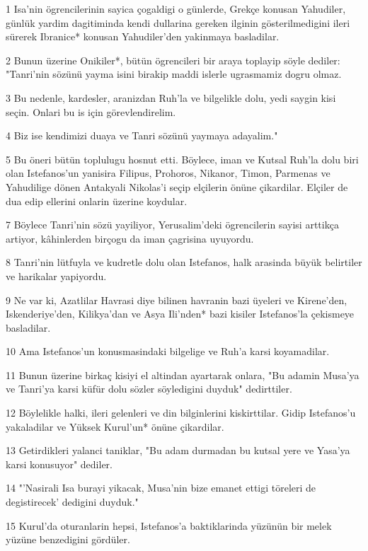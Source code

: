 \par 1 Isa'nin ögrencilerinin sayica çogaldigi o günlerde, Grekçe konusan Yahudiler, günlük yardim dagitiminda kendi dullarina gereken ilginin gösterilmedigini ileri sürerek Ibranice* konusan Yahudiler'den yakinmaya basladilar.
\par 2 Bunun üzerine Onikiler*, bütün ögrencileri bir araya toplayip söyle dediler: "Tanri'nin sözünü yayma isini birakip maddi islerle ugrasmamiz dogru olmaz.
\par 3 Bu nedenle, kardesler, aranizdan Ruh'la ve bilgelikle dolu, yedi saygin kisi seçin. Onlari bu is için görevlendirelim.
\par 4 Biz ise kendimizi duaya ve Tanri sözünü yaymaya adayalim."
\par 5 Bu öneri bütün toplulugu hosnut etti. Böylece, iman ve Kutsal Ruh'la dolu biri olan Istefanos'un yanisira Filipus, Prohoros, Nikanor, Timon, Parmenas ve Yahudilige dönen Antakyali Nikolas'i seçip elçilerin önüne çikardilar. Elçiler de dua edip ellerini onlarin üzerine koydular.
\par 7 Böylece Tanri'nin sözü yayiliyor, Yerusalim'deki ögrencilerin sayisi arttikça artiyor, kâhinlerden birçogu da iman çagrisina uyuyordu.
\par 8 Tanri'nin lütfuyla ve kudretle dolu olan Istefanos, halk arasinda büyük belirtiler ve harikalar yapiyordu.
\par 9 Ne var ki, Azatlilar Havrasi diye bilinen havranin bazi üyeleri ve Kirene'den, Iskenderiye'den, Kilikya'dan ve Asya Ili'nden* bazi kisiler Istefanos'la çekismeye basladilar.
\par 10 Ama Istefanos'un konusmasindaki bilgelige ve Ruh'a karsi koyamadilar.
\par 11 Bunun üzerine birkaç kisiyi el altindan ayartarak onlara, "Bu adamin Musa'ya ve Tanri'ya karsi küfür dolu sözler söyledigini duyduk" dedirttiler.
\par 12 Böylelikle halki, ileri gelenleri ve din bilginlerini kiskirttilar. Gidip Istefanos'u yakaladilar ve Yüksek Kurul'un* önüne çikardilar.
\par 13 Getirdikleri yalanci taniklar, "Bu adam durmadan bu kutsal yere ve Yasa'ya karsi konusuyor" dediler.
\par 14 "'Nasirali Isa burayi yikacak, Musa'nin bize emanet ettigi töreleri de degistirecek' dedigini duyduk."
\par 15 Kurul'da oturanlarin hepsi, Istefanos'a baktiklarinda yüzünün bir melek yüzüne benzedigini gördüler.

